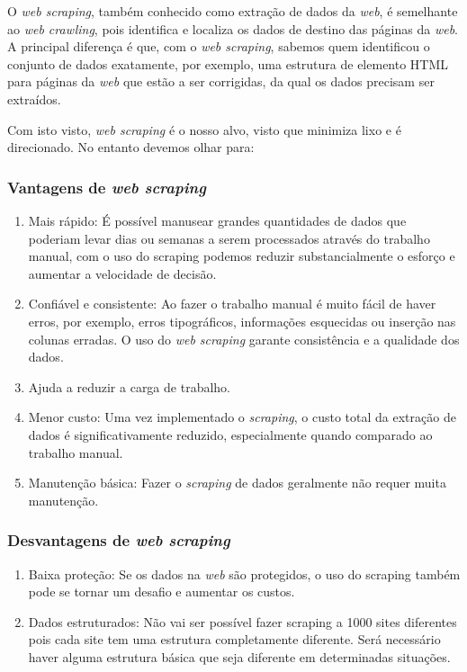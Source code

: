 \documentclass[a4paper,10pt]{article}
\begin{document}
O \textit{web scraping}, também conhecido como extração de dados da \textit{web}, é semelhante ao \textit{web crawling}, pois identifica e localiza os dados de destino das páginas da \textit{web}.
A principal diferença é que, com o \textit{web scraping}, sabemos quem identificou o conjunto de dados exatamente, por exemplo, uma estrutura de elemento HTML para páginas da \textit{web} que estão a ser corrigidas, da qual os dados precisam ser extraídos.

Com isto visto, \textit{web scraping} é o nosso alvo, visto que minimiza lixo e é direcionado.
No entanto devemos olhar para:

\subsubsection{Vantagens de \textit{web scraping}}

\begin{enumerate}
    \item Mais rápido: É possível manusear grandes quantidades de dados que poderiam levar dias ou semanas a serem processados através do trabalho manual, com o uso do scraping podemos reduzir substancialmente o esforço e aumentar a velocidade de decisão.
    \item Confiável e consistente: Ao fazer o trabalho manual é muito fácil de haver erros, por exemplo, erros tipográficos, informações esquecidas ou inserção nas colunas erradas. O uso do \textit{web scraping} garante consistência e a qualidade dos dados.
    \item Ajuda a reduzir a carga de trabalho.
    \item Menor custo: Uma vez implementado o \textit{scraping}, o custo total da extração de dados é significativamente reduzido, especialmente quando comparado ao trabalho manual.
    \item Manutenção básica: Fazer o \textit{scraping} de dados geralmente não requer muita manutenção.
\end{enumerate}

\subsubsection{Desvantagens de \textit{web scraping}}

\begin{enumerate}
    \item Baixa proteção: Se os dados na \textit{web} são protegidos, o uso do scraping também pode se tornar um desafio e aumentar os custos.
    \item Dados estruturados: Não vai ser possível fazer scraping a 1000 sites diferentes pois cada site tem uma estrutura completamente diferente. Será necessário haver alguma estrutura básica que seja diferente em determinadas situações.
\end{enumerate}
\end{document}
